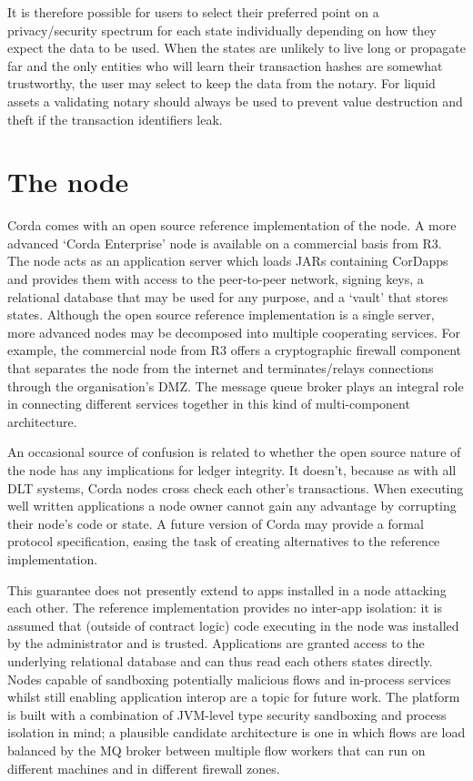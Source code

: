 \documentclass{article}
\begin{document}
It is therefore possible for users to select their preferred point on a privacy/security spectrum for each state
individually depending on how they expect the data to be used. When the states are unlikely to live long or
propagate far and the only entities who will learn their transaction hashes are somewhat trustworthy, the user may
select to keep the data from the notary. For liquid assets a validating notary should always be used to prevent
value destruction and theft if the transaction identifiers leak.

\section{The node}\label{sec:node}

Corda comes with an open source reference implementation of the node. A more advanced `Corda Enterprise' node is
available on a commercial basis from R3. The node acts as an application server which loads JARs containing
CorDapps and provides them with access to the peer-to-peer network, signing keys, a relational database that may
be used for any purpose, and a `vault' that stores states. Although the open source reference implementation is
a single server, more advanced nodes may be decomposed into multiple cooperating services. For example, the
commercial node from R3 offers a cryptographic firewall component that separates the node from the internet and
terminates/relays connections through the organisation's DMZ. The message queue broker plays an integral role
in connecting different services together in this kind of multi-component architecture.

An occasional source of confusion is related to whether the open source nature of the node has any implications for
ledger integrity. It doesn't, because as with all DLT systems, Corda nodes cross check each other's transactions.
When executing well written applications a node owner cannot gain any advantage by corrupting their node's code or
state. A future version of Corda may provide a formal protocol specification, easing the task of creating
alternatives to the reference implementation.

This guarantee does not presently extend to apps installed in a node attacking each other. The reference
implementation provides no inter-app isolation: it is assumed that (outside of contract logic) code executing in
the node was installed by the administrator and is trusted. Applications are granted access to the underlying
relational database and can thus read each others states directly. Nodes capable of sandboxing potentially
malicious flows and in-process services whilst still enabling application interop are a topic for future work.
The platform is built with a combination of JVM-level type security sandboxing and process isolation in mind; a
plausible candidate architecture is one in which flows are load balanced by the MQ broker between multiple flow
workers that can run on different machines and in different firewall zones.
\end{document}
